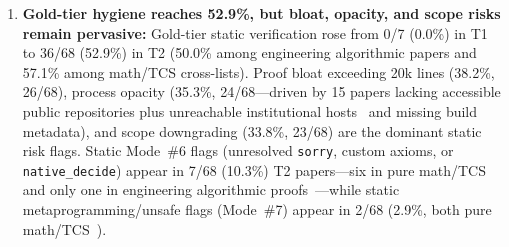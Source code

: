 \documentclass[11pt,letterpaper]{article}
\begin{document}
\begin{enumerate}
  \item \textbf{Gold-tier hygiene reaches 52.9\%, but bloat, opacity, and scope risks remain pervasive:} Gold-tier static verification rose from 0/7 (0.0\%) in T1 to 36/68 (52.9\%) in T2 (50.0\% among engineering algorithmic papers and 57.1\% among math/TCS cross-lists). Proof bloat exceeding 20k lines (38.2\%, 26/68), process opacity (35.3\%, 24/68---driven by 15 papers lacking accessible public repositories plus unreachable institutional hosts~\cite{arxiv2611_22732,arxiv2611_09169} and missing build metadata), and scope downgrading (33.8\%, 23/68) are the dominant static risk flags. Static Mode~\#6 flags (unresolved \texttt{sorry}, custom axioms, or \texttt{native\_decide}) appear in 7/68 (10.3\%) T2 papers---six in pure math/TCS and only one in engineering algorithmic proofs~\cite{arxiv2611_07395}---while static metaprogramming/unsafe flags (Mode~\#7) appear in 2/68 (2.9\%, both pure math/TCS~\cite{arxiv2611_06896,arxiv2611_15751}).
\end{enumerate}
\end{document}
